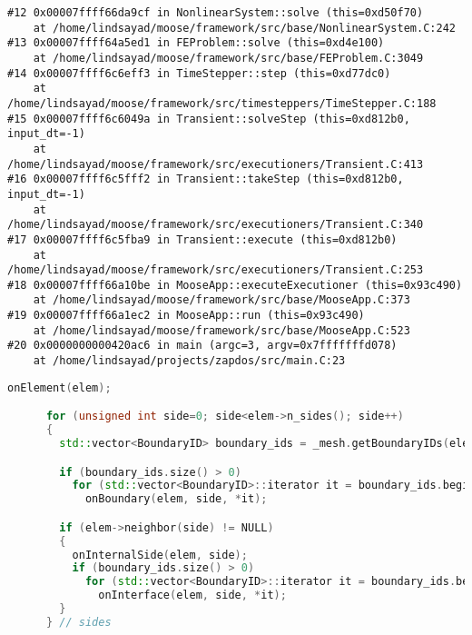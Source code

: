 \begin{lstlisting}[caption = Stack trace showing the architecture for how InterfaceKernel residuals get called, label = code:stack]
#12 0x00007ffff66da9cf in NonlinearSystem::solve (this=0xd50f70)
    at /home/lindsayad/moose/framework/src/base/NonlinearSystem.C:242
#13 0x00007ffff64a5ed1 in FEProblem::solve (this=0xd4e100)
    at /home/lindsayad/moose/framework/src/base/FEProblem.C:3049
#14 0x00007ffff6c6eff3 in TimeStepper::step (this=0xd77dc0)
    at /home/lindsayad/moose/framework/src/timesteppers/TimeStepper.C:188
#15 0x00007ffff6c6049a in Transient::solveStep (this=0xd812b0, input_dt=-1)
    at /home/lindsayad/moose/framework/src/executioners/Transient.C:413
#16 0x00007ffff6c5fff2 in Transient::takeStep (this=0xd812b0, input_dt=-1)
    at /home/lindsayad/moose/framework/src/executioners/Transient.C:340
#17 0x00007ffff6c5fba9 in Transient::execute (this=0xd812b0)
    at /home/lindsayad/moose/framework/src/executioners/Transient.C:253
#18 0x00007ffff66a10be in MooseApp::executeExecutioner (this=0x93c490)
    at /home/lindsayad/moose/framework/src/base/MooseApp.C:373
#19 0x00007ffff66a1ec2 in MooseApp::run (this=0x93c490)
    at /home/lindsayad/moose/framework/src/base/MooseApp.C:523
#20 0x0000000000420ac6 in main (argc=3, argv=0x7fffffffd078)
    at /home/lindsayad/projects/zapdos/src/main.C:23
\end{lstlisting}

\begin{lstlisting}[language = C++, caption = Snapshot of different geometric object calls in ThreadedElementLoopBase::operator, label = code:ThreadedElementLoopBase]
      onElement(elem);

      for (unsigned int side=0; side<elem->n_sides(); side++)
      {
        std::vector<BoundaryID> boundary_ids = _mesh.getBoundaryIDs(elem, side);

        if (boundary_ids.size() > 0)
          for (std::vector<BoundaryID>::iterator it = boundary_ids.begin(); it != boundary_ids.end(); ++it)
            onBoundary(elem, side, *it);

        if (elem->neighbor(side) != NULL)
        {
          onInternalSide(elem, side);
          if (boundary_ids.size() > 0)
            for (std::vector<BoundaryID>::iterator it = boundary_ids.begin(); it != boundary_ids.end(); ++it)
              onInterface(elem, side, *it);
        }
      } // sides
\end{lstlisting}

